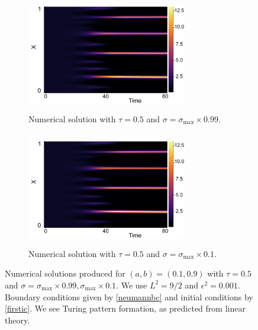 \begin{figure}[H]
    \centering
    \begin{subfigure}[t]{0.45\textwidth}
        \centering
        \includegraphics[width=7cm,height=5cm]{applin1.png}
        \caption{Numerical solution with $\tau=0.5$ and $\sigma=\sigma_{\max}\times0.99$.}
        \label{}
    \end{subfigure}
    \hfill
    \begin{subfigure}[t]{0.45\textwidth}
        \centering
        \includegraphics[width=7cm,height=5cm]{applin1.png}
        \caption{Numerical solution with $\tau=0.5$ and $\sigma=\sigma_{\max}\times0.1$.}
        \label{}
    \end{subfigure}
    \caption{Numerical solutions produced for $(a,b)=(0.1,0.9)$ with $\tau=0.5$ and $\sigma=\sigma_{\max}\times0.99, \sigma_{\max}\times0.1$. We use $L^2=9/2$ and $\epsilon^2=0.001$. Boundary conditions given by \eqref{neumannbc} and initial conditions by \eqref{firstic}. We see Turing pattern formation, as predicted from linear theory.}
    \label{fig:linapp1}
\end{figure}

